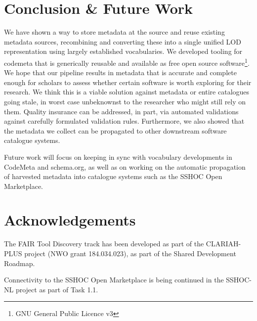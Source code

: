 \documentclass[a4paper,11pt]{article}
\begin{document}
\section{Conclusion \& Future Work}

We have shown a way to store metadata at the source and reuse existing metadata
sources, recombining and converting these into a single unified LOD
representation using largely established vocabularies. We developed tooling for
codemeta that is generically reusable and available as free open source
software\footnote{GNU General Public Licence v3}. We hope that our pipeline
results in metadata that is accurate and complete enough for scholars to assess
whether certain software is worth exploring for their research. We think this
is a viable solution against metadata or entire catalogues going stale, in
worst case unbeknownst to the researcher who might still rely on them. Quality
insurance can be addressed, in part, via automated validations against
carefully formulated validation rules. Furthermore, we also showed that the
metadata we collect can be propagated to other downstream software
catalogue systems.

Future work will focus on keeping in sync with vocabulary developments in
CodeMeta and schema.org, as well as on working on the automatic propagation of
harvested metadata into catalogue systems such as the SSHOC Open Marketplace.

\section*{Acknowledgements}

The FAIR Tool Discovery track has been developed as part of the CLARIAH-PLUS
project (NWO grant 184.034.023), as part of the Shared Development Roadmap.

Connectivity to the SSHOC Open Marketplace is being continued in the 
SSHOC-NL project as part of Task 1.1.

\printbibliography
\end{document}
